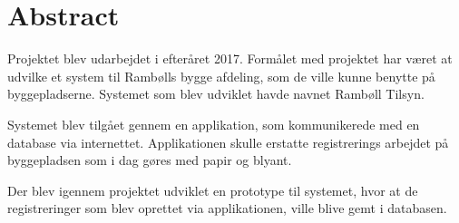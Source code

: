 {\let\clearpage\relax \chapter*{Abstract}}
Projektet blev udarbejdet i efteråret 2017. Formålet med projektet har været at udvilke et system til Rambølls bygge afdeling, som de ville kunne benytte på byggepladserne. Systemet som blev udviklet havde navnet Rambøll Tilsyn.

Systemet blev tilgået gennem en applikation, som kommunikerede med en database via internettet.
Applikationen skulle erstatte registrerings arbejdet på byggepladsen som i dag gøres med papir og blyant.

Der blev igennem projektet udviklet en prototype til systemet, hvor at de registreringer som blev oprettet via applikationen, ville blive gemt i databasen.  \\ \\
\clearpage



